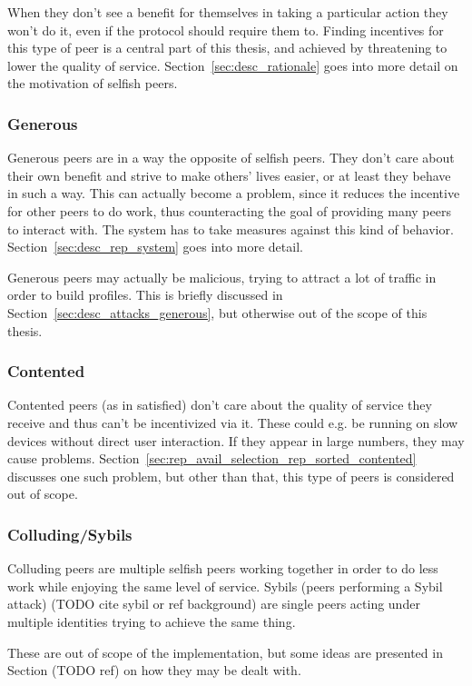 When they don't see a benefit for themselves in taking a particular action they
won't do it, even if the protocol should require them to. Finding incentives for
this type of peer is a central part of this thesis, and achieved by threatening
to lower the quality of service. Section~\ref{sec:desc_rationale} goes into more
detail on the motivation of selfish peers.

\subsubsection{Generous}
\label{sec:desc_generous_peers}
Generous peers are in a way the opposite of selfish peers. They don't care about
their own benefit and strive to make others' lives easier, or at least they
behave in such a way. This can actually become a problem, since it reduces the
incentive for other peers to do work, thus counteracting the goal of providing
many peers to interact with. The system has to take measures against this kind
of behavior. Section~\ref{sec:desc_rep_system} goes into more detail.

Generous peers may actually be malicious, trying to attract a lot of traffic in
order to build profiles. This is briefly discussed in
Section~\ref{sec:desc_attacks_generous}, but otherwise out of the scope of this
thesis.

\subsubsection{Contented}
\label{sec:desc_contented_peers}
Contented peers (as in satisfied) don't care about the quality of service they
receive and thus can't be incentivized via it. These could e.g. be running on
slow devices without direct user interaction. If they appear in large numbers,
they may cause problems.
Section~\ref{sec:rep_avail_selection_rep_sorted_contented} discusses one such
problem, but other than that, this type of peers is considered out of scope.

\subsubsection{Colluding/Sybils}
Colluding peers are multiple selfish peers working together in order to do less
work while enjoying the same level of service. Sybils (peers performing a Sybil
attack) (TODO cite sybil or ref background) are single peers acting under
multiple identities trying to achieve the same thing.

These are out of scope of the implementation, but some ideas are presented in
Section (TODO ref) on how they may be dealt with.

